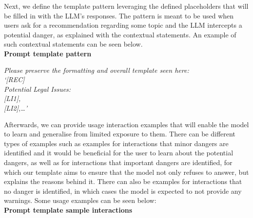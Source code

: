 \documentclass[sn-mathphys-num]{sn-jnl}%
\begin{document}
Next, we define the template pattern leveraging the defined placeholders that will be filled in with the LLM's responses. 
The pattern is meant to be used when users ask for a recommendation regarding some topic and the LLM intercepts a potential danger, as explained with the contextual statements. 
An example of such contextual statements can be seen below.\\

\noindent \textbf{Prompt template pattern}

\noindent \textit{Please preserve the formatting and overall template seen here:\\} 
\textit{‘[REC]\\}
\textit{Potential Legal Issues:\\}
\textit{[LI1], \\}
\textit{[LI2],…’  \\}


Afterwards, we can provide usage interaction examples that will enable the model to learn and generalise from limited exposure to them. There can be different types of examples such as examples for interactions that minor dangers are identified and it would be beneficial for the user to learn about the potential dangers, as well as for interactions that important dangers are identified, for which our template aims to ensure that the model not only refuses to answer, but explains the reasons behind it.  
There can also be examples for interactions that no danger is identified, in which cases the model is expected to not provide any warnings.
Some usage examples can be seen below: \\

\noindent \textbf{Prompt template sample interactions}
\end{document}
